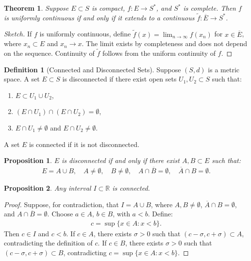 \documentclass[7pt]{article}
\theoremstyle{definition}
\newtheorem{definition}{Definition}
\theoremstyle{plain}
\newtheorem{theorem}{Theorem}
\newtheorem{proposition}{Proposition}
\begin{document}
\begin{theorem}
Suppose $ E \subset S $ is compact, $ f : E \to S^* $, and $ S^* $ is complete. Then $ f $ is uniformly continuous if and only if it extends to a continuous $ \tilde{f} : \overline{E} \to S^* $.
\end{theorem}

\begin{proof}[Sketch]
If $ f $ is uniformly continuous, define $ \tilde{f}(x) = \lim_{n \to \infty} f(x_n) $ for $ x \in \overline{E} $, where $ x_n \subset E $ and $ x_n \to x $. The limit exists by completeness and does not depend on the sequence. Continuity of $ \tilde{f} $ follows from the uniform continuity of $ f $.
\end{proof}

\begin{definition}[Connected and Disconnected Sets]
Suppose $ (S, d) $ is a metric space. A set $ E \subset S $ is disconnected if there exist open sets $ U_1, U_2 \subset S $ such that:
\begin{enumerate}
    \item $ E \subset U_1 \cup U_2 $,
    \item $ (E \cap U_1) \cap (E \cap U_2) = \emptyset $,
    \item $ E \cap U_1 \neq \emptyset $ and $ E \cap U_2 \neq \emptyset $.
\end{enumerate}
A set $ E $ is connected if it is not disconnected.
\end{definition}

\begin{proposition}
$ E $ is disconnected if and only if there exist $ A, B \subset E $ such that:
\begin{align}
E = A \cup B, \quad A \neq \emptyset, \quad B \neq \emptyset, \quad A \cap \overline{B} = \emptyset, \quad \overline{A} \cap B = \emptyset.
\end{align}
\end{proposition}

\begin{proposition}
Any interval $ I \subset \mathbb{R} $ is connected.
\end{proposition}

\begin{proof}
Suppose, for contradiction, that $ I = A \cup B $, where $ A, B \neq \emptyset $, $ \overline{A} \cap B = \emptyset $, and $ A \cap \overline{B} = \emptyset $. Choose $ a \in A $, $ b \in B $, with $ a < b $. Define:
\begin{align}
c = \sup \{x \in A : x < b\}.
\end{align}
Then $ c \in I $ and $ c < b $. If $ c \in A $, there exists $ \sigma > 0 $ such that $ (c - \sigma, c + \sigma) \subset A $, contradicting the definition of $ c $. If $ c \in B $, there exists $ \sigma > 0 $ such that $ (c - \sigma, c + \sigma) \subset B $, contradicting $ c = \sup \{x \in A : x < b\} $.
\end{proof}
\end{document}
